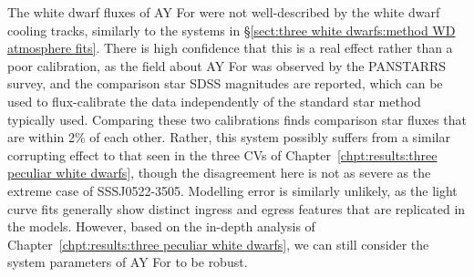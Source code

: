 The white dwarf fluxes of AY For were not well-described by the white dwarf cooling tracks, similarly to the systems in \S\ref{sect:three white dwarfs:method WD atmosphere fits}. There is high confidence that this is a real effect rather than a poor calibration, as the field about AY For was observed by the PANSTARRS survey, and the comparison star SDSS magnitudes are reported, which can be used to flux-calibrate the data independently of the standard star method typically used. Comparing these two calibrations finds comparison star fluxes that are within 2\% of each other. Rather, this system possibly suffers from a similar corrupting effect to that seen in the three CVs of Chapter~\ref{chpt:results:three peculiar white dwarfs}, though the disagreement here is not as severe as the extreme case of SSSJ0522-3505. Modelling error is similarly unlikely, as the light curve fits generally show distinct ingress and egress features that are replicated in the models. However, based on the in-depth analysis of Chapter~\ref{chpt:results:three peculiar white dwarfs}, we can still consider the system parameters of AY For to be robust.


%     


